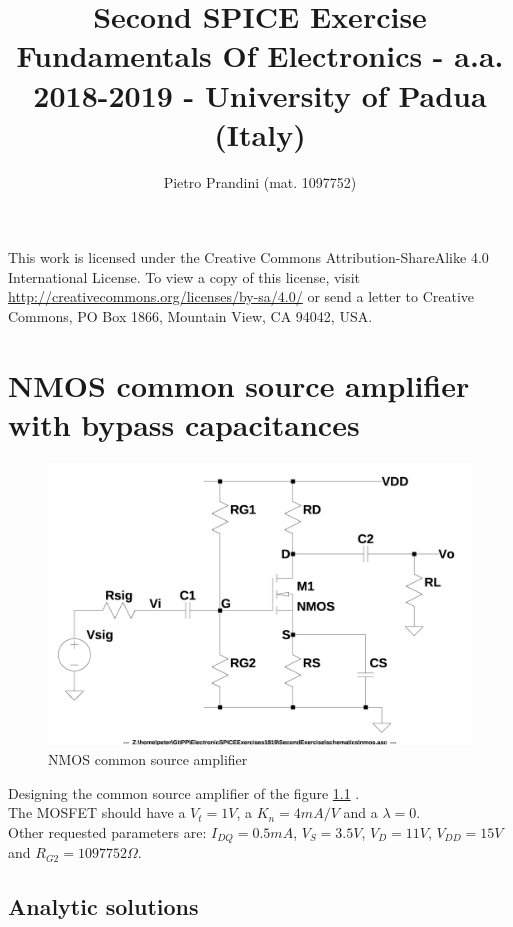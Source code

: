 \documentclass[10pt,a4paper]{book}
\title{Second SPICE Exercise\\{\small{Fundamentals Of Electronics - a.a. 2018-2019 -
University of Padua (Italy)}}}
\author{Pietro Prandini (mat. 1097752)}
\begin{document}
\maketitle

\vspace*{\fill}
\begin{center}
\tiny{This work is licensed under the Creative Commons Attribution-ShareAlike 4.0 International License. To view a copy of this license, visit \href{http://creativecommons.org/licenses/by-sa/4.0/}{http://creativecommons.org/licenses/by-sa/4.0/} or send a letter to Creative Commons, PO Box 1866, Mountain View, CA 94042, USA.}
\end{center}

\tableofcontents

\chapter{NMOS common source amplifier with bypass capacitances}
\begin{figure}[h]
  \centering
  \includegraphics[width=12cm]{schematics/nmos.jpg}
  \caption{NMOS common source amplifier}
  \label{nmos}
\end{figure}

Designing the common source amplifier of the figure \ref{nmos} .\\
The MOSFET should have a $V_t = 1V$, a $K_n = 4mA/V$ and a $\lambda = 0$.\\
Other requested parameters are: $I_{DQ} = 0.5mA$, $V_S = 3.5V$, $V_D = 11V$, $V_{DD} = 15V$ and $R_{G2} = 1097752\Omega$.\par

\section{Analytic solutions}
\end{document}
